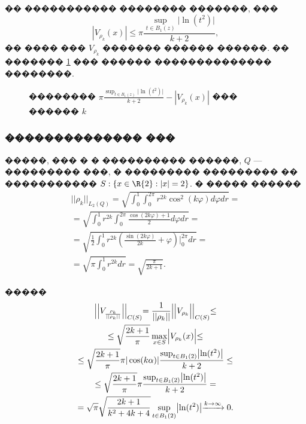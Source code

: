 \documentclass[a4paper]{article}
\begin{document}
�� ����������� �������� �������, ���
\begin{equation}
  | V_{\rho_k}(x)| \leq \pi \frac{\sup_{t \in B_1(z)} \bigl| \ln (t^2) \bigl|}{k+2},
\end{equation}
�� ���� ��� $V_{\rho_k}$ ������� ������ ������. �� ������� \ref{chis} ��� ������ �������������� ��������.
\begin{figure}[h!]
  \noindent{}
  \caption{�������� $\pi \frac{\sup_{t \in B_1(z)} \bigl| \ln (t^2) \bigl|}{k+2} -| V_{\rho_k}(x)| $ ��� ������ $k$}
  \label{chis}
\end{figure}

\subsubsection{�������������� ���}
�����, ��� � � ���������� ������, $Q$ --- ��������� ���, � ��������� ��������� �� ����������� $S: \{x\in \R{2}: |x|=2 \}$. � ����� ������
\begin{multline}
  ||\rho_k ||_{L_2(Q)}=\sqrt{\int_0^1 \int_0^{2 \pi} r^{2k} \cos^2(k \varphi) d\varphi dr}= \\
  = \sqrt{\int_0^1 r^{2k} \int_0^{2 \pi} \frac{\cos(2k \varphi)+1}{2}  d\varphi dr}=\\
  =\sqrt{\frac{1}{2} \int_0^1 r^{2k} \left( \frac{\sin(2k \varphi)}{2k} +\varphi\right)\Biggl|_0^{2 \pi} dr}= \\
  =\sqrt{\pi \int_0^1 r^{2k} dr}=\sqrt{\frac{\pi}{2k+1}}.
\end{multline}

�����
\begin{multline}
  \Bigl|\Bigl|V_{\frac{\rho_k}{||\rho_k ||}}\Bigl|\Bigl|_{C(S)}= \frac{1}{||\rho_k ||} \Bigl|\Bigl|V_{\rho_k}  \Bigl|\Bigl|_{C(S)} \leq\\
  \leq \sqrt{\frac{2k+1}{\pi}} \max_{x \in S} \Bigl| V_{\rho_k}(x) \Bigl|\leq\\
  \leq \sqrt{\frac{2k+1}{\pi}} \pi |\cos(k\alpha)| \frac{\sup_{t \in B_1(2)} \bigl| \ln (t^2) \bigl|}{k+2} \leq\\
  \leq \sqrt{\frac{2k+1}{\pi}} \pi \frac{\sup_{ t \in B_1(2)} \bigl| \ln (t^2) \bigl|}{k+2} = \\
  =\sqrt{\pi} \sqrt{\frac{2k+1}{k^2 + 4k+4}}\sup_{t \in B_1(2)} \bigl| \ln (t^2) \bigl| \xrightarrow{k \rightarrow \infty} 0.
\end{multline}
\end{document}

